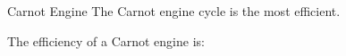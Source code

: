 \documentclass[12pt,aspectratio=169,dvipsnames]{beamer}
\begin{document}



\begin{frame}{Carnot Engine}
  The Carnot engine cycle is the most efficient.
  \begin{center}
  \end{center}
  The efficiency of a Carnot engine is:
  
\end{frame}
\end{document}
